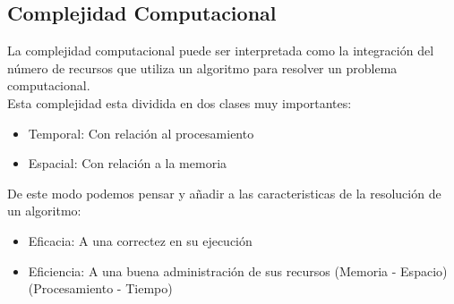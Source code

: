 \documentclass[10pt,executivepaper]{article}
\begin{document}
\subsection{Complejidad Computacional}
La complejidad computacional puede ser interpretada como la integración del número de recursos que utiliza un algoritmo para resolver un problema computacional.\\
Esta complejidad esta dividida en dos clases muy importantes:\\
\begin{itemize}
  \item Temporal: Con relación al procesamiento
  \item Espacial: Con relación a la memoria
\end{itemize}
De este modo podemos pensar y añadir a las caracteristicas de la resolución de un algoritmo:
\begin{itemize}
  \item Eficacia: A una correctez en su ejecución
  \item Eficiencia: A una buena administración de sus recursos (Memoria - Espacio) (Procesamiento - Tiempo)
\end{itemize}
\end{document}
